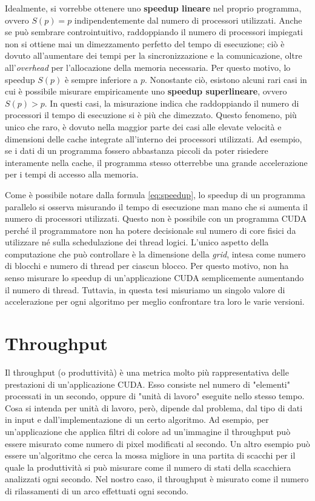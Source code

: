 \documentclass[12pt,a4paper,oneside]{book}
\begin{document}
	Idealmente, si vorrebbe ottenere uno \textbf{speedup lineare} nel proprio programma, ovvero $S(p) = p$ indipendentemente dal numero di processori utilizzati. Anche se può sembrare controintuitivo, raddoppiando il numero di processori impiegati non si ottiene mai un dimezzamento perfetto del tempo di esecuzione; ciò è dovuto all'aumentare dei tempi per la sincronizzazione e la comunicazione, oltre all'\textit{overhead} per l'allocazione della memoria necessaria. Per questo motivo, lo speedup $S(p)$ è sempre inferiore a $p$. Nonostante ciò, esistono alcuni rari casi in cui è possibile misurare empiricamente uno \textbf{speedup superlineare}, ovvero $S(p) > p$. In questi casi, la misurazione indica che raddoppiando il numero di processori il tempo di esecuzione si è più che dimezzato. Questo fenomeno, più unico che raro, è dovuto nella maggior parte dei casi alle elevate velocità e dimensioni delle cache integrate all'interno dei processori utilizzati. Ad esempio, se i dati di un programma fossero abbastanza piccoli da poter risiedere interamente nella cache, il programma stesso otterrebbe una grande accelerazione per i tempi di accesso alla memoria.
	
	Come è possibile notare dalla formula \ref{eq:speedup}, lo speedup di un programma parallelo si osserva misurando il tempo di esecuzione man mano che si aumenta il numero di processori utilizzati. Questo non è possibile con un programma CUDA perché il programmatore non ha potere decisionale sul numero di core fisici da utilizzare né sulla schedulazione dei thread logici. L'unico aspetto della computazione che può controllare è la dimensione della \textit{grid}, intesa come numero di blocchi e numero di thread per ciascun blocco. Per questo motivo, non ha senso misurare lo speedup di un'applicazione CUDA semplicemente aumentando il numero di thread. Tuttavia, in questa tesi misuriamo un singolo valore di accelerazione per ogni algoritmo per meglio confrontare tra loro le varie versioni.
	
	\section{Throughput}
	Il throughput (o produttività) è una metrica molto più rappresentativa delle prestazioni di un'applicazione CUDA. Esso consiste nel numero di "elementi" processati in un secondo, oppure di "unità di lavoro" eseguite nello stesso tempo. Cosa si intenda per unità di lavoro, però, dipende dal problema, dal tipo di dati in input e dall'implementazione di un certo algoritmo. Ad esempio, per un'applicazione che applica filtri di colore ad un'immagine il throughput può essere misurato come numero di pixel modificati al secondo. Un altro esempio può essere un'algoritmo che cerca la mossa migliore in una partita di scacchi per il quale la produttività si può misurare come il numero di stati della scacchiera analizzati ogni secondo. Nel nostro caso, il throughput è misurato come il numero di rilassamenti di un arco effettuati ogni secondo.
	
\end{document}
